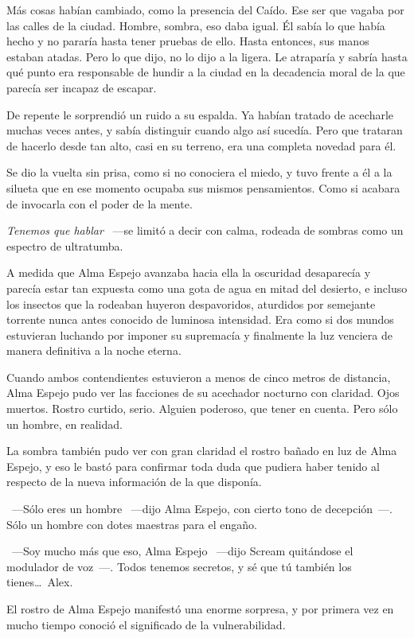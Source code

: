 Más cosas habían cambiado, como la presencia del Caído. Ese ser que vagaba por las calles de la ciudad. Hombre, sombra, eso daba igual. Él sabía lo que había hecho y no pararía hasta tener pruebas de ello. Hasta entonces, sus manos estaban atadas. Pero lo que dijo, no lo dijo a la ligera. Le atraparía y sabría hasta qué punto era responsable de hundir a la ciudad en la decadencia moral de la que parecía ser incapaz de escapar.

De repente le sorprendió un ruido a su espalda. Ya habían tratado de acecharle muchas veces antes, y sabía distinguir cuando algo así sucedía. Pero que trataran de hacerlo desde tan alto, casi en su terreno, era una completa novedad para él.

Se dio la vuelta sin prisa, como si no conociera el miedo, y tuvo frente a él a la silueta que en ese momento ocupaba sus mismos pensamientos. Como si acabara de invocarla con el poder de la mente.

\emph{Tenemos que hablar} ~---se limitó a decir con calma, rodeada de sombras como un espectro de ultratumba.

A medida que Alma Espejo avanzaba hacia ella la oscuridad desaparecía y parecía estar tan expuesta como una gota de agua en mitad del desierto, e incluso los insectos que la rodeaban huyeron despavoridos, aturdidos por semejante torrente nunca antes conocido de luminosa intensidad. Era como si dos mundos estuvieran luchando por imponer su supremacía y finalmente la luz venciera de manera definitiva a la noche eterna.

Cuando ambos contendientes estuvieron a menos de cinco metros de distancia, Alma Espejo pudo ver las facciones de su acechador nocturno con claridad. Ojos muertos. Rostro curtido, serio. Alguien poderoso, que tener en cuenta. Pero sólo un hombre, en realidad.

La sombra también pudo ver con gran claridad el rostro bañado en luz de Alma Espejo, y eso le bastó para confirmar toda duda que pudiera haber tenido al respecto de la nueva información de la que disponía.

~---Sólo eres un hombre ~---dijo Alma Espejo, con cierto tono de decepción~---. Sólo un hombre con dotes maestras para el engaño.

~---Soy mucho más que eso, Alma Espejo ~---dijo Scream quitándose el modulador de voz~---. Todos tenemos secretos, y sé que tú también los tienes\dots\ Alex.

El rostro de Alma Espejo manifestó una enorme sorpresa, y por primera vez en mucho tiempo conoció el significado de la vulnerabilidad.

